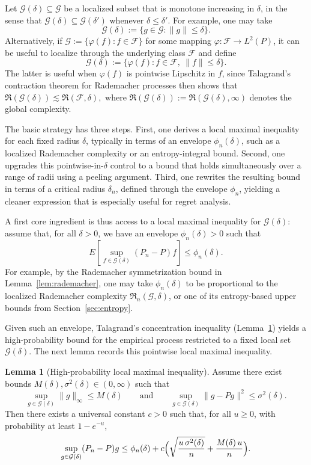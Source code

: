 \documentclass[11pt]{article}
\theoremstyle{plain}
\theoremstyle{definition} %
\newtheorem{lemma}{Lemma}
\begin{document}
Let \(\mathcal{G}(\delta)\subseteq \mathcal{G}\) be a localized subset that is monotone increasing in \(\delta\), in the sense that \(\mathcal{G}(\delta)\subseteq \mathcal{G}(\delta')\) whenever \(\delta \le \delta'\). For example, one may take
\[
\mathcal{G}(\delta):=\{g\in\mathcal{G}:\|g\|\le \delta\}.
\]
Alternatively, if \(\mathcal{G}:=\{\varphi(f): f\in\mathcal{F}\}\) for some mapping \(\varphi:\mathcal{F}\to L^2(P)\), it can be useful to localize through the underlying class \(\mathcal{F}\) and define
\[
\mathcal{G}(\delta):=\{\varphi(f): f\in\mathcal{F},\ \|f\|\le \delta\}.
\]
The latter is useful when \(\varphi(f)\) is pointwise Lipschitz in \(f\), since Talagrand's contraction theorem for Rademacher processes then shows that $\mathfrak{R}(\mathcal{G}(\delta)) \lesssim \mathfrak{R}(\mathcal{F}, \delta),$
where \(\mathfrak{R}(\mathcal{G}(\delta)) := \mathfrak{R}(\mathcal{G}(\delta), \infty)\) denotes the global complexity.

 

The basic strategy has three steps. First, one derives a local maximal inequality for each fixed radius \(\delta\), typically in terms of an envelope \(\phi_n(\delta)\), such as a localized Rademacher complexity or an entropy-integral bound. Second, one upgrades this pointwise-in-\(\delta\) control to a bound that holds simultaneously over a range of radii using a peeling argument. Third, one rewrites the resulting bound in terms of a critical radius \(\delta_n\), defined through the envelope \(\phi_n\), yielding a cleaner expression that is especially useful for regret analysis.

A first core ingredient is thus access to a local maximal inequality for \(\mathcal{G}(\delta)\): assume that, for all \(\delta>0\), we have an envelope \(\phi_n(\delta)>0\) such that
\[
E\left[\sup_{f \in \mathcal{G}(\delta)} (P_n - P)f \right] \le \phi_n(\delta).
\]
For example, by the Rademacher symmetrization bound in Lemma~\ref{lem:rademacher}, one may take \(\phi_n(\delta)\) to be proportional to the localized Rademacher complexity \(\mathfrak{R}_n(\mathcal{G}, \delta)\), or one of its entropy-based upper bounds from Section~\ref{sec:entropy}.

Given such an envelope, Talagrand's concentration inequality (Lemma~\ref{lem:bousquet}) yields a high-probability bound for the empirical process restricted to a fixed local set \(\mathcal{G}(\delta)\). The next lemma records this pointwise local maximal inequality. 

\begin{lemma}[High-probability local maximal inequality]
\label{lem:bousquet}
Assume there exist bounds \(M(\delta), \sigma^2(\delta)\in(0,\infty)\) such that
\[
\sup_{g\in\mathcal{G}(\delta)}\|g\|_\infty \le M(\delta)
\qquad\text{and}\qquad
\sup_{g\in\mathcal{G}(\delta)} \|g-Pg\|^2 \le \sigma^2(\delta).
\]
Then there exists a universal constant \(c>0\) such that, for all \(u\ge 0\), with probability at least \(1-e^{-u}\),
\[
\sup_{g\in\mathcal{G}(\delta)} (P_n-P)g
\le
\phi_n(\delta)
+
c\Bigl(
  \sqrt{\frac{u\,\sigma^2(\delta)}{n}}
  + \frac{M(\delta)\,u}{n}
\Bigr).
\]
\end{lemma}
\end{document}
